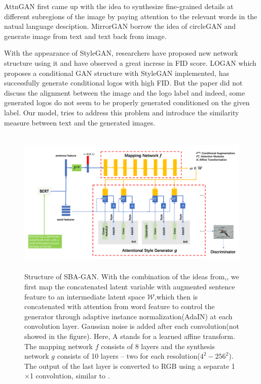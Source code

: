 \documentclass{article}
\begin{document}
AttnGAN \cite{attngan} first came up with the idea to synthesize fine-grained details at different subregions of the image by paying attention to the relevant words in the natual language desciption. MirrorGAN\cite{mirrorgan} borrow the idea of circleGAN\cite{cyclegan} and generate image from text and text back from image.

With the appearance of StyleGAN\cite{stylegan}, researchers have proposed new network structure using it and have observed a great increse in FID score\cite{fid}. LOGAN \cite{logan} which proposes a conditional GAN structure with StyleGAN implemented, has successfully generate conditional logos with high FID. But the paper did not discuss the alignment between the image and the logo label and indeed, some generated logos do not seem to be properly generated conditioned on the given label. Our model, tries to address this problem and introduce the similarity measure between text and the generated images.


\begin{figure}[htbp]

\centering
\includegraphics[width=400pt, height=200pt]{milestone/network.png} 
\caption{Structure of SBA-GAN. With the combination of the ideas from\cite{stylegan},\cite{stackgan}, we first map the concatenated latent variable with augmented sentence feature to an intermediate latent space $\mathcal{W}$,which then is concatenated with attention from word feature to control the generator through adaptive instance normalization(AdaIN) at each convolution layer. Gaussian noise is added after each convolution(not showed in the figure). Here, A stands for a learned affine transform. The mapping network $f$ consists of 8 layers and the synthesis network $g$ consists of 10 layers -- two for each resolution($4^2 - 256^2$). The output of the last layer is converted to RGB using a separate 1$\times$1 convolution, similar to \cite{progan}.}
\label{model}
\end{figure}
\end{document}
